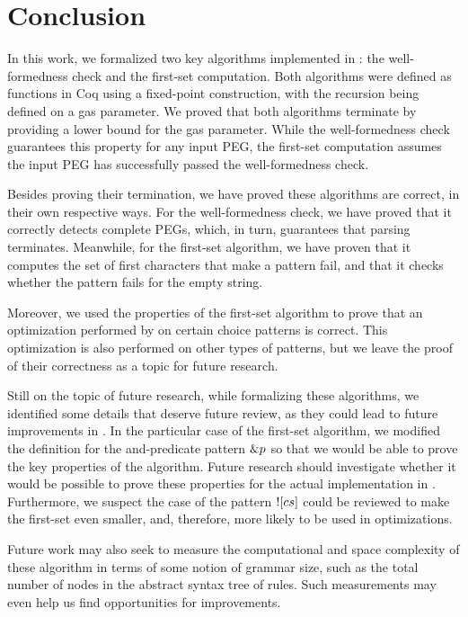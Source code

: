 \chapter{Conclusion}
\label{chapter:conclusion}

In this work,
we formalized two key algorithms implemented in \lpeg{}:
the well-formedness check and the first-set computation.
Both algorithms were defined as functions in Coq
using a fixed-point construction,
with the recursion being defined on a gas parameter.
We proved that both algorithms terminate
by providing a lower bound for the gas parameter.
While the well-formedness check guarantees
this property for any input PEG,
the first-set computation assumes
the input PEG has successfully passed the well-formedness check.

Besides proving their termination,
we have proved these algorithms are correct,
in their own respective ways.
For the well-formedness check,
we have proved that it correctly detects complete PEGs,
which, in turn, guarantees that parsing terminates.
Meanwhile, for the first-set algorithm,
we have proven that it computes the set of first characters that make a pattern fail,
and that it checks whether the pattern fails for the empty string.

Moreover,
we used the properties of the first-set algorithm
to prove that an optimization performed by \lpeg{}
on certain choice patterns is correct.
This optimization is also performed on other types
of patterns, but we leave the proof of their correctness
as a topic for future research.

Still on the topic of future research,
while formalizing these algorithms,
we identified some details that deserve future review,
as they could lead to future improvements in \lpeg{}.
In the particular case of the first-set algorithm,
we modified the definition for the and-predicate pattern $\&p$
so that we would be able to prove the key properties of the algorithm.
Future research should investigate whether it would be possible
to prove these properties for the actual implementation in \lpeg{}.
Furthermore, we suspect the case of the pattern $![cs]$
could be reviewed to make the first-set even smaller,
and, therefore, more likely to be used in optimizations.

Future work may also seek to measure the
computational and space complexity
of these algorithm in terms of
some notion of grammar size,
such as the total number of nodes
in the abstract syntax tree of rules.
Such measurements may even help us
find opportunities for improvements.